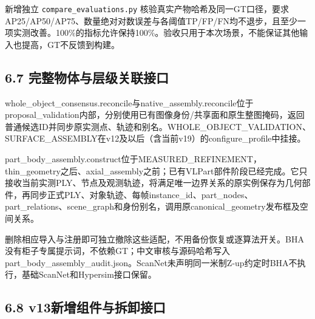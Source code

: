 \documentclass[UTF8,fontset=fandol]{ctexart}
\begin{document}
新增独立 \texttt{compare\_\allowbreak{}evaluations.\allowbreak{}py} 核验真实产物哈希及同一GT口径，要求AP25/AP50/AP75、数量绝对对数误差与各阈值TP/FP/FN均不退步，且至少一项实测改善。100\%的指标允许保持100\%。验收只用于本次场景，不能保证其他输入也提高，GT不反馈到构建。



\subsection*{6.7 完整物体与层级关联接口}

whole\_object\_consensus.reconcile与native\_assembly.reconcile位于proposal\_validation内部，分别使用已有图像身份/共享面和原生整图掩码，返回普通候选ID并同步原实测点、轨迹和别名。WHOLE\_OBJECT\_VALIDATION、SURFACE\_ASSEMBLY在v12及以后（含当前v19）的configure\_profile中挂接。



part\_body\_assembly.construct位于MEASURED\_REFINEMENT，thin\_geometry之后、axial\_assembly之前；已有VLPart部件阶段已经完成。它只接收当前实测PLY、节点及观测轨迹，将满足唯一边界关系的原实例保存为几何部件，再同步正式PLY、对象轨迹、每帧instance\_id、part\_nodes、part\_relations、scene\_graph和身份别名，调用原canonical\_geometry发布框及空间关系。



删除相应导入与注册即可独立撤除这些适配，不用备份恢复或逐算法开关。BHA没有柜子专属提示词，不依赖GT；中文审核与源码哈希写入part\_body\_assembly\_audit.json。ScanNet未声明同一米制Z-up约定时BHA不执行，基础ScanNet和Hypersim接口保留。



\subsection*{6.8 v13新增组件与拆卸接口}
\end{document}

